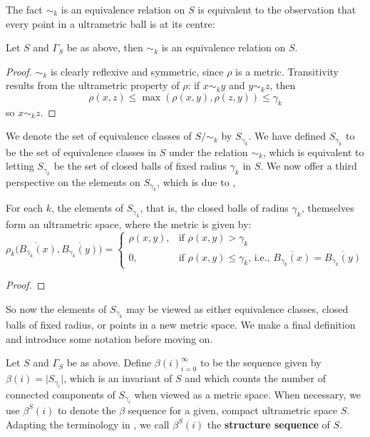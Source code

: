 The fact $\sim_k$ is an equivalence relation on $S$ is equivalent to the observation that every point in a ultrametric ball is at its centre:

\begin{lemma*}
Let  $S$ and $\Gamma_S$ be as above, then $\sim_k$ is an equivalence relation on $S$.
\end{lemma*}

\begin{proof}
$\sim_k$ is clearly reflexive and symmetric, since $\rho$ is a metric. Transitivity results from the ultrametric property of $\rho$: if $x \sim_k y$ and $y \sim_k z$, then $$\rho(x, z) \leq \max(\rho(x,y), \rho(z,y)) \leq \gamma_k$$ so $x \sim_k z$. 
\end{proof}

 We denote the set of equivalence classes of $S/\sim_k$ by $S_{\gamma_k}$. We have defined  $S_{\gamma_k}$ to be the set of equivalence classes in $S$ under the relation $\sim_k$, which is equivalent to letting $S_{\gamma_k}$ be the set of closed balls of fixed radius $\gamma_k$ in  $S$. We now offer a third perspective on the elements on $S_{\gamma_k}$, which is due to \cite{na},

\begin{lemma*}
For each $k$, the elements of $S_{\gamma_k}$, that is, the closed balls of radius $\gamma_k$, themselves form an ultrametric space, where the metric is given by:
\[ \rho_k\overline{(B_{\gamma_k}(x)},\overline{B_{\gamma_k}(y)}) = 
\begin{cases}
\rho(x,y), & \text{if } \rho(x,y) > \gamma_k \\
0, & \text{if }   \rho(x,y) \leq \gamma_k \text{, i.e., } \overline{B_{\gamma_k}(x)}=\overline{B_{\gamma_k}(y)}
\end{cases}
\]
\end{lemma*}

\begin{proof}
\end{proof}

So now the elements of $S_{\gamma_k}$ may be viewed as either equivalence classes, closed balls of fixed radius, or points in a new metric space. We  make a final definition and introduce some notation before moving on.

\begin{definition*}
Let $S$ and $\Gamma_S$ be as above. Define $\beta(i)_{i=0}^{\infty}$ to be the sequence given by $\beta(i) = \lvert  S_{\gamma_i}\rvert$, which is an invariant of $S$ and which counts the number of connected components of $S_{\gamma_i}$ when viewed as a metric space. When necessary, we use $\beta^S(i)$ to denote the $\beta$ sequence for a given, compact  ultrametric space $S$. Adapting the terminology in \cite{fp}, we call $\beta^S(i)$ the \textbf{structure sequence} of $S$.
\end{definition*}

